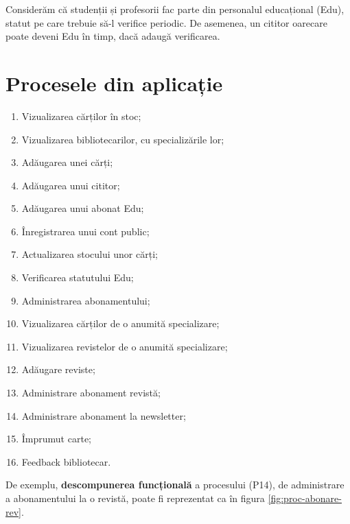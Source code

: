 Considerăm că studenții și profesorii fac parte din personalul educațional
(Edu), statut pe care trebuie să-l verifice periodic. De asemenea, un
cititor oarecare poate deveni Edu în timp, dacă adaugă verificarea.

\section{Procesele din aplicație}
\label{sec:procese}

\begin{enumerate}[(P1)]
\item Vizualizarea cărților în stoc;
\item Vizualizarea bibliotecarilor, cu specializările lor;
\item Adăugarea unei cărți;
\item Adăugarea unui cititor;
\item Adăugarea unui abonat Edu;
\item Înregistrarea unui cont public;
\item Actualizarea stocului unor cărți;
\item Verificarea statutului Edu;
\item Administrarea abonamentului;
\item Vizualizarea cărților de o anumită specializare;
\item Vizualizarea revistelor de o anumită specializare;
\item Adăugare reviste;
\item Administrare abonament revistă;
\item Administrare abonament la newsletter;
\item Împrumut carte;
\item Feedback bibliotecar.
\end{enumerate}

De exemplu, \textbf{descompunerea funcțională} a procesului (P14),
de administrare a abonamentului la o revistă, poate fi reprezentat ca în
figura \ref{fig:proc-abonare-rev}.

